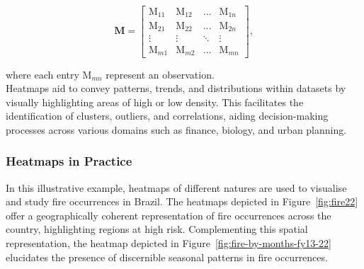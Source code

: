 \documentclass{article}\usepackage[]{graphicx}\usepackage[]{xcolor}
\numberwithin{equation}{section}
\begin{document}
$$\mathbf{M} =
\left[
\begin{array}{cccc}
    \mathrm{M}_{11} & \mathrm{M}_{12} & \ldots & \mathrm{M}_{1n} \\  
    \mathrm{M}_{21} & \mathrm{M}_{22} & \ldots & \mathrm{M}_{2n} \\  
    \vdots & \vdots & \ddots & \vdots \\  
    \mathrm{M}_{m1} & \mathrm{M}_{m2} & \ldots & \mathrm{M}_{mn}
\end{array}
\right],
$$

\noindent
where each entry $\mathrm{M}_{mn}$ represent an observation.\\

\noindent Heatmaps aid to convey patterns, trends, and distributions within datasets by visually highlighting areas of high or low density. This facilitates the identification of clusters, outliers, and correlations, aiding decision-making processes across various domains such as finance, biology, and urban planning. 

\subsubsection{Heatmaps in Practice}
\noindent
In this illustrative example, heatmaps of different natures are used to visualise and study fire occurrences in Brazil. The heatmaps depicted in Figure~\ref{fig:fire22} offer a geographically coherent representation of fire occurrences across the country, highlighting regions at high risk. Complementing this spatial representation, the heatmap depicted in Figure~\ref{fig:fire-by-months-fy13-22} elucidates the presence of discernible seasonal patterns in fire occurrences.\\
\end{document}
